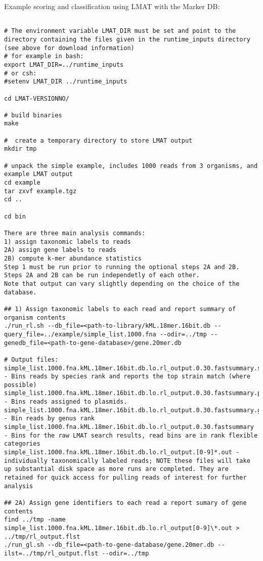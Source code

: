 \documentclass[11pt]{article}
\begin{document}
   
Example scoring and classification using LMAT with the Marker DB:

\begin{verbatim}

# The environment variable LMAT_DIR must be set and point to the directory containing the files given in the runtime_inputs directory (see above for download information)
# for example in bash:
export LMAT_DIR=../runtime_inputs
# or csh:
#setenv LMAT_DIR ../runtime_inputs

cd LMAT-VERSIONNO/

# build binaries
make

#  create a temporary directory to store LMAT output
mkdir tmp

# unpack the simple example, includes 1000 reads from 3 organisms, and example LMAT output
cd example
tar zxvf example.tgz
cd ..

cd bin

There are three main analysis commands: 
1) assign taxonomic labels to reads
2A) assign gene labels to reads
2B) compute k-mer abundance statistics
Step 1 must be run prior to running the optional steps 2A and 2B. Steps 2A and 2B can be run independetly of each other.
Note that output can vary slightly depending on the choice of the database.

## 1) Assign taxonomic labels to each read and report summary of organism contents
./run_rl.sh --db_file=<path-to-library/kML.18mer.16bit.db --query_file=../example/simple_list.1000.fna --odir=../tmp --genedb_file=<path-to-gene-database>/gene.20mer.db

# Output files:
simple_list.1000.fna.kML.18mer.16bit.db.lo.rl_output.0.30.fastsummary.species - Bins reads by species rank and reports the top strain match (where possible)
simple_list.1000.fna.kML.18mer.16bit.db.lo.rl_output.0.30.fastsummary.plasmid - Bins reads assigned to plasmids.
simple_list.1000.fna.kML.18mer.16bit.db.lo.rl_output.0.30.fastsummary.genus - Bin reads by genus rank
simple_list.1000.fna.kML.18mer.16bit.db.lo.rl_output.0.30.fastsummary - Bins for the raw LMAT search results, read bins are in rank flexible categories
simple_list.1000.fna.kML.18mer.16bit.db.lo.rl_output.[0-9]*.out - individually taxonomically labeled reads; NOTE these files will take up substantial disk space as more runs are completed. They are retained for quick access for pulling reads of interest for further analysis 

## 2A) Assign gene identifiers to each read a report sumary of gene contents
find ../tmp -name simple_list.1000.fna.kML.18mer.16bit.db.lo.rl_output[0-9]\*.out > ../tmp/rl_output.flst
./run_gl.sh --db_file=<path-to-gene-database/gene.20mer.db --ilst=../tmp/rl_output.flst --odir=../tmp 


\end{verbatim}
\end{document}

